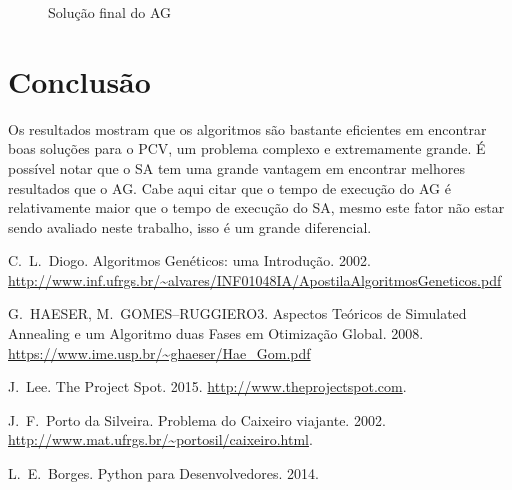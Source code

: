 \documentclass[journal, a4paper]{IEEEtran}
\begin{document}
    \begin{figure}[H]
		\begin{center}
		\caption{Solução final do AG}
		\label{fig:100-genetic}
		\end{center}
	\end{figure}


\section{Conclusão}
	Os resultados mostram que os algoritmos são bastante eficientes em encontrar boas soluções para o PCV, um problema complexo e extremamente grande. É possível notar que o SA tem uma grande vantagem em encontrar melhores resultados que o AG. Cabe aqui citar que o tempo de execução do AG é relativamente maior que o tempo de execução do SA, mesmo este fator não estar sendo avaliado neste trabalho, isso é um grande diferencial.

\begin{thebibliography}{5}
	C.~L.~Diogo. Algoritmos Genéticos: uma Introdução. 2002.
    \url{http://www.inf.ufrgs.br/~alvares/INF01048IA/ApostilaAlgoritmosGeneticos.pdf}

	G.~HAESER, M.~GOMES–RUGGIERO3. Aspectos Teóricos de Simulated Annealing e um Algoritmo duas Fases em Otimização Global. 2008.
	\url{https://www.ime.usp.br/~ghaeser/Hae_Gom.pdf}

    J.~Lee. The Project Spot. 2015. \url{http://www.theprojectspot.com}.

	J.~F.~Porto da Silveira. Problema do Caixeiro viajante. 2002.
    \url{http://www.mat.ufrgs.br/~portosil/caixeiro.html}.

    L.~E.~Borges. Python para Desenvolvedores. 2014.
\end{thebibliography}
\end{document}
